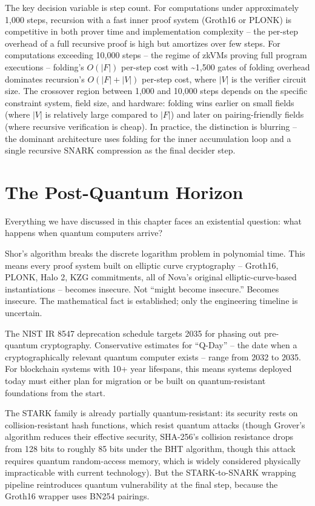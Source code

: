 \documentclass[
  11pt,
  openany]{report}
\begin{document}
The key decision variable is step count. For computations under approximately
1,000 steps, recursion with a fast inner proof system (Groth16 or PLONK) is
competitive in both prover time and implementation complexity -- the per-step
overhead of a full recursive proof is high but amortizes over few steps. For
computations exceeding 10,000 steps -- the regime of zkVMs proving full program
executions -- folding's \(O(|F|)\) per-step cost with \textasciitilde1,500 gates
of folding overhead dominates recursion's \(O(|F| + |V|)\) per-step cost, where
\(|V|\) is the verifier circuit size. The crossover region between 1,000 and
10,000 steps depends on the specific constraint system, field size, and
hardware: folding wins earlier on small fields (where \(|V|\) is relatively
large compared to \(|F|\)) and later on pairing-friendly fields (where recursive
verification is cheap). In practice, the distinction is blurring -- the dominant
architecture uses folding for the inner accumulation loop and a single recursive
SNARK compression as the final decider step.

\section{The Post-Quantum Horizon}\label{the-post-quantum-horizon}

Everything we have discussed in this chapter faces an existential question: what
happens when quantum computers arrive?

Shor's algorithm breaks the discrete logarithm problem in polynomial time. This
means every proof system built on elliptic curve cryptography -- Groth16, PLONK,
Halo 2, KZG commitments, all of Nova's original elliptic-curve-based
instantiations -- becomes insecure. Not ``might become insecure.'' Becomes
insecure. The mathematical fact is established; only the engineering timeline is
uncertain.

The NIST IR 8547 deprecation schedule targets 2035 for phasing out pre-quantum
cryptography. Conservative estimates for ``Q-Day'' -- the date when a
cryptographically relevant quantum computer exists -- range from 2032 to 2035.
For blockchain systems with 10+ year lifespans, this means systems deployed
today must either plan for migration or be built on quantum-resistant
foundations from the start.

The STARK family is already partially quantum-resistant: its security rests on
collision-resistant hash functions, which resist quantum attacks (though
Grover's algorithm reduces their effective security, SHA-256's collision
resistance drops from 128 bits to roughly 85 bits under the BHT algorithm,
though this attack requires quantum random-access memory, which is widely
considered physically impracticable with current technology). But the
STARK-to-SNARK wrapping pipeline reintroduces quantum vulnerability at the final
step, because the Groth16 wrapper uses BN254 pairings.
\end{document}
